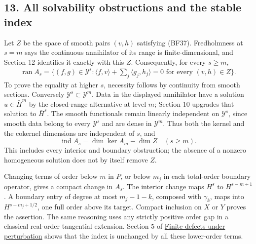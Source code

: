 \documentclass[
  11pt,
]{article}
\begin{document}
\subsection{13. All solvability obstructions and the stable
index}\label{all-solvability-obstructions-and-the-stable-index}

Let \(Z\) be the space of smooth pairs \((v,h)\) satisfying (BF37).
Fredholmness at \(s=m\) says the continuous annihilator of its range is
finite-dimensional, and Section 12 identifies it exactly with this
\(Z\). Consequently, for every \(s\geq m\), \[
\begin{split}
 \operatorname{ran}A_s
 =\{(f,g)\in\mathcal Y^s:
 \langle f,v\rangle+\sum_j\langle g_j,h_j\rangle=0
 \text{ for every }(v,h)\in Z\}.
\end{split}
 \tag{BF42}
\] To prove the equality at higher \(s\), necessity follows by
continuity from smooth sections. Conversely
\(\mathcal Y^s\subset\mathcal Y^m\). Data in the displayed annihilator
have a solution \(u\in\bar H^m\) by the closed-range alternative at
level \(m\); Section 10 upgrades that solution to \(\bar H^s\). The
smooth functionals remain linearly independent on \(\mathcal Y^s\),
since smooth data belong to every \(\mathcal Y^s\) and are dense in
\(\mathcal Y^m\). Thus both the kernel and the cokernel dimensions are
independent of \(s\), and \[
 \operatorname{ind}A_s=\dim\ker A_m-\dim Z
 \quad(s\geq m).
 \tag{BF43}
\] This includes every interior and boundary obstruction; the absence of
a nonzero homogeneous solution does not by itself remove \(Z\).

Changing terms of order below \(m\) in \(P\), or below \(m_j\) in each
total-order boundary operator, gives a compact change in \(A_s\). The
interior change maps \(H^s\) to \(H^{s-m+1}\). A boundary entry of
degree at most \(m_j-1-k\), composed with \(\gamma_k\), maps into
\(H^{s-m_j+1/2}\), one full order above its target. Compact inclusion on
\(X\) or \(Y\) proves the assertion. The same reasoning uses any
strictly positive order gap in a classical real-order tangential
extension. Section 5 of \href{fredholm-stability.pdf}{Finite defects
under perturbation} shows that the index is unchanged by all these
lower-order terms.
\end{document}
